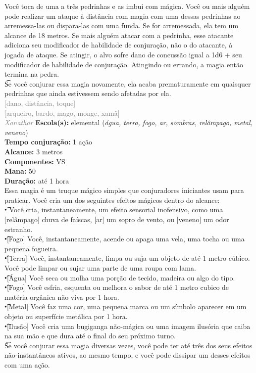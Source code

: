 \documentclass{RPG_Adventure}[2021/10/20]
\begin{document}
{\normalsize Você toca de uma a três pedrinhas e as imbui com mágica. Você ou mais alguém pode realizar um ataque à distância com magia com uma dessas pedrinhas ao arremessa-las ou dispara-las com uma funda. Se for arremessada, ela tem um alcance de 18 metros. Se mais alguém atacar com a pedrinha, esse atacante adiciona seu modificador de habilidade de conjuração, não o do atacante, à jogada de ataque. Se atingir, o alvo sofre dano de concussão igual a 1d6 + seu modificador de habilidade de conjuração. Atingindo ou errando, a magia então termina na pedra.\\\t Se você conjurar essa magia novamente, ela acaba prematuramente em quaisquer pedrinhas que ainda estivessem sendo afetadas por ela.\\}
{\scriptsize \textcolor{gray}{[dano, distância, toque]\\}}
{\scriptsize \textcolor{gray}{[arqueiro, bardo, mago, monge, xamã]\\}}
{\tiny \textcolor{gray}{\textit{Xanathar}}}\jump{}
{\small \t \textbf{Escola(s):} elemental (\textit{água, terra, fogo, ar, sombras, relâmpago, metal, veneno})\\\t \textbf{Tempo conjuração:} 1 ação\\\t \textbf{Alcance:} 3 metros\\\t \textbf{Componentes:} VS\\\t \textbf{Mana:} 50\\\t \textbf{Duração:} até 1 hora\\}
{\normalsize Essa magia é um truque mágico simples que conjuradores iniciantes usam para praticar. Você cria um dos seguintes efeitos mágicos dentro do alcance:\\\t • Você cria, instantaneamente, um efeito sensorial inofensivo, como uma [relâmpago] chuva de faíscas, [ar] um sopro de vento, ou [veneno] um odor estranho.\\\t •[Fogo] Você, instantaneamente, acende ou apaga uma vela, uma tocha ou uma pequena fogueira.\\\t •[Terra] Você, instantaneamente, limpa ou suja um objeto de até 1 metro cúbico. Você pode limpar ou sujar uma parte de uma roupa com lama.\\\t •[Água] Você seca ou molha uma porção de tecido, madeira ou algo do tipo.\\\t •[Fogo] Você esfria, esquenta ou melhora o sabor de até 1 metro cubico de matéria orgânica não viva por 1 hora.\\\t •[Metal] Você faz uma cor, uma pequena marca ou um símbolo aparecer em um objeto ou superfície metálica por 1 hora.\\\t •[Ilusão] Você cria uma bugiganga não-mágica ou uma imagem ilusória que caiba na sua mão e que dura até o final do seu próximo turno.\\\t Se você conjurar essa magia diversas vezes, você pode ter até três dos seus efeitos não-instantâneos ativos, ao mesmo tempo, e você pode dissipar um desses efeitos com uma ação.\\}
\end{document}

